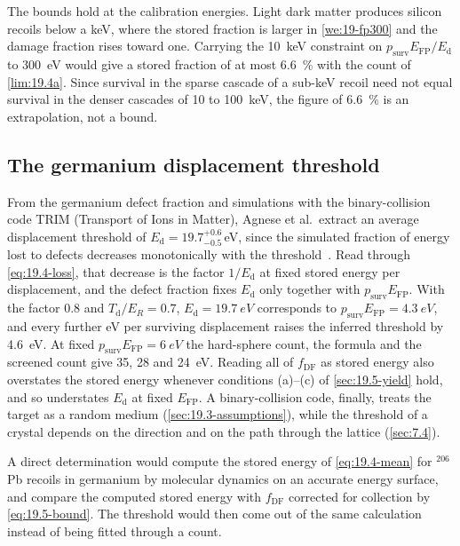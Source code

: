 The bounds hold at the calibration energies. Light dark matter produces silicon recoils below a keV, where the stored fraction is larger in \cref{we:19-fp300} and the damage fraction rises toward one. Carrying the \SI{10}{keV} constraint on $p_{\mathrm{surv}}E_{\mathrm{FP}}/E_{\mathrm{d}}$ to \SI{300}{eV} would give a stored fraction of at most \SI{6.6}{\percent} with the count of \cref{lim:19.4a}. Since survival in the sparse cascade of a sub-keV recoil need not equal survival in the denser cascades of 10 to \SI{100}{keV}, the figure of \SI{6.6}{\percent} is an extrapolation, not a bound.

\subsection{The germanium displacement threshold}\label{sec:19.4-germanium}

From the germanium defect fraction and simulations with the binary-collision code TRIM (Transport of Ions in Matter), Agnese et al.\ extract an average displacement threshold of $E_{\mathrm{d}} = 19.7^{+0.6}_{-0.5}$\,eV, since the simulated fraction of energy lost to defects decreases monotonically with the threshold~\cite[Sect.~V\,B]{agnese2018energy}. Read through \cref{eq:19.4-loss}, that decrease is the factor $1/E_{\mathrm{d}}$ at fixed stored energy per displacement, and the defect fraction fixes $E_{\mathrm{d}}$ only together with $p_{\mathrm{surv}}E_{\mathrm{FP}}$. With the factor 0.8 and $T_{\mathrm{d}}/E_R = 0.7$, $E_{\mathrm{d}} = \SI{19.7}{eV}$ corresponds to $p_{\mathrm{surv}}E_{\mathrm{FP}} = \SI{4.3}{eV}$, and every further eV per surviving displacement raises the inferred threshold by \SI{4.6}{eV}. At fixed $p_{\mathrm{surv}}E_{\mathrm{FP}} = \SI{6}{eV}$ the hard-sphere count, the formula and the screened count give 35, 28 and \SI{24}{eV}. Reading all of $f_{\mathrm{DF}}$ as stored energy also overstates the stored energy whenever conditions (a)--(c) of \cref{sec:19.5-yield} hold, and so understates $E_{\mathrm{d}}$ at fixed $E_{\mathrm{FP}}$. A binary-collision code, finally, treats the target as a random medium (\cref{sec:19.3-assumptions}), while the threshold of a crystal depends on the direction and on the path through the lattice (\cref{sec:7.4}).

A direct determination would compute the stored energy of \cref{eq:19.4-mean} for $^{206}$Pb recoils in germanium by molecular dynamics on an accurate energy surface, and compare the computed stored energy with $f_{\mathrm{DF}}$ corrected for collection by \cref{eq:19.5-bound}. The threshold would then come out of the same calculation instead of being fitted through a count.


